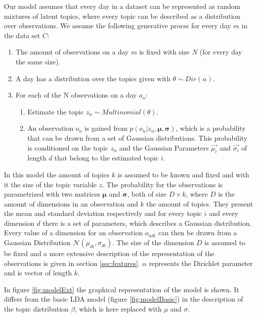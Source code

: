 \documentclass[11pt,a4paper]{article}
\begin{document}
  Our model assumes that every day in a dataset can be represented as random mixtures of latent topics, where every topic can be described as a distribution over observations. We assume the following generative procss for every day $m$ in the data set $C$:
\begin{enumerate}
 \item The amount of observations on a day $m$ is fixed with size $N$ (for every day the same size).
 \item A day has a distribution over the topics given with $\theta \sim Dir(\alpha)$.
 \item For each of the N observations on a day $o_n$:
 
 \begin{enumerate}
  \item Estimate the topic $z_n \sim Multinomial(\theta)$.
  \item An observation $o_n$ is gained from $p(o_n |z_n,\boldsymbol\mu,\boldsymbol\sigma)$,  which is a probability that can be drawn from a set of Gaussian distributions. This probability is conditioned on the topic $z_n$ and the Gaussian Parameters $\vec{\mu_i}$ and $\vec{\sigma_i}$ of length $d$ that belong to the estimated topic $i$.
 \end{enumerate}

\end{enumerate}
  
In this model the amount of topics $k$ is assumed to be known and fixed and with it the size of the topic variable $z$.
The probability for the observations is parametrized with two matrices $\boldsymbol\mu$ and $\boldsymbol\sigma$, both of size $D\times k$, where $D$ is the amount of dimensions in an observation and $k$ the amount of topics. They present the mean and standard deviation respectively and for every topic $i$ and every dimension $d$ there is a set of parameters, which describes a Gaussian distribution. Every value of a dimension for an observation $o_{ndi}$ can then be drawn from a Gaussian Distribution $\mathcal{N}(\mu_{di},\sigma_{di})$.
The size of the dimension $D$ is assumed to be fixed and a more extensive description of the representation of the observations is given in section \ref{sec:features}. $\alpha$ represents the Dirichlet parameter and is vector of length $k$.

In figure \ref{fig:modelExt} the graphical representation of the model is shown. It differs from the basic LDA model (figure \ref{fig:modelBasic}) in the description of the topic distribution $\beta$, which is here replaced with $\mu$ and $\sigma$.
\end{document}
